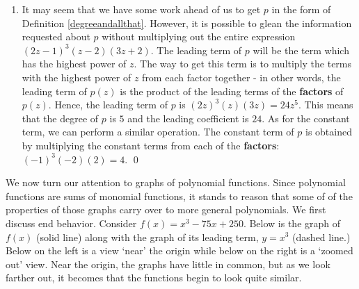 \documentclass{ximera}
\begin{document}
\begin{ex}
\begin{enumerate}
\item  It may seem that we have some work ahead of us to get $p$ in the form of Definition \ref{degreeandallthat}.  However, it is possible to glean the information requested about $p$ without multiplying out the entire expression $(2z-1)^{3}(z-2)(3z+2)$.  The leading term of $p$ will be the term which has the highest power of $z$.  The way to get this term  is to multiply the terms with the highest power of $z$ from each factor together - in other words, the leading term of $p(z)$ is the product of the leading terms of the \textbf{factors} of $p(z)$.  Hence, the leading term of $p$ is $(2z)^3(z)(3z) =  24z^5$.  This means that the degree of $p$ is $5$ and the leading coefficient is $24$.  As for the constant term, we can perform a similar operation.  The constant term  of $p$ is obtained by multiplying the constant terms from each of the \textbf{factors}: $(-1)^3(-2)(2) = 4$.  \qed

\end{enumerate}

\end{ex}


We now turn our attention to graphs of polynomial functions. Since polynomial functions are sums of monomial functions, it stands to reason that some of of the properties of those graphs carry over to more general polynomials. We first discuss end behavior.  Consider $f(x) = x^3-75x+250$.   Below  is the graph of  $f(x)$ (solid line) along with the graph of its leading term, $y = x^3$ (dashed line.)  Below on the left is a view `near' the origin while below on the right is a `zoomed out' view.  Near the origin, the graphs have little in common, but as we look farther out, it becomes that the functions begin to look quite similar.  
\end{document}
